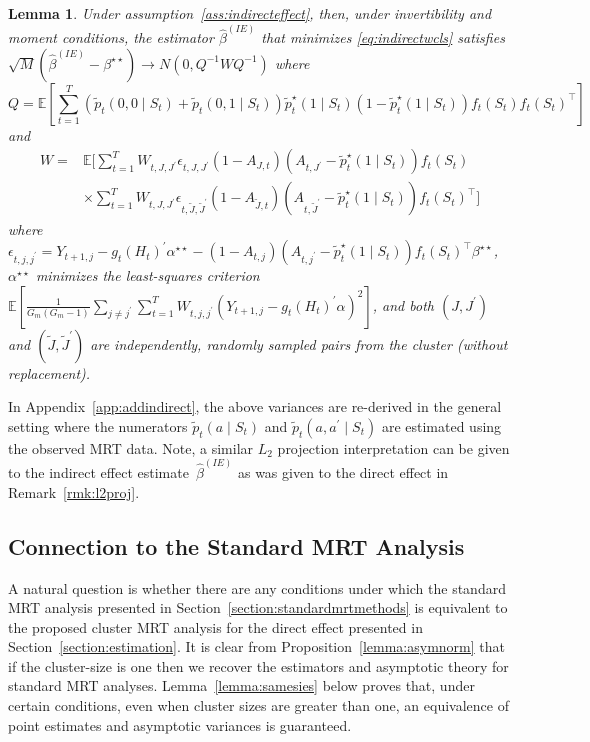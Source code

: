 \documentclass[12pt]{article}
\newtheorem{lemma}[thm]{Lemma}
\begin{document}
\begin{lemma}
\label{lemma:asymnorm2}
Under assumption~\ref{ass:indirecteffect}, then, under invertibility and moment conditions, the estimator $\hat \beta^{(IE)}$ that minimizes \eqref{eq:indirectwcls} satisfies $\sqrt{M} \left( \hat \beta^{(IE)} - \beta^{\star \star} \right) \to N(0, Q^{-1} W Q^{-1})$ where
$$
Q = \mathbb{E} \left[ \sum_{t=1}^T (\tilde p_t (0,0 \mid S_t) + \tilde p_t (0,1 \mid S_t)) \tilde p_t^\star ( 1 \mid S_{t} ) ( 1- \tilde p_t^\star ( 1 \mid S_{t} )) f_t (S_t) f_t (S_t)^\top \right]
$$
and
\begin{align*}
W =  &\mathbb{E} \bigg[ \sum_{t=1}^T W_{t,J,J^\prime} \epsilon_{t,J,J^\prime} (1-A_{J,t})( A_{t,J^\prime} - \tilde p_t^\star( 1 \mid S_{t} )) f_t (S_t) \\
&\times \sum_{t=1}^T W_{t,J,J^\prime} \epsilon_{t, \tilde J, \tilde J^\prime} (1-A_{\tilde J,t}) ( A_{t,\tilde J^\prime} - \tilde p_t^\star( 1 \mid S_{t} )) f_t (S_t)^\top  \bigg]
\end{align*}
where $\epsilon_{t,j,j^\prime} = Y_{t+1,j} - g_t(H_t)^\prime \alpha^{\star \star} - (1-A_{t,j}) (A_{t,j^\prime} - \tilde p_t^\star (1 \mid S_t) ) f_t (S_t)^\top \beta^{\star \star}$, $\alpha^{\star \star}$ minimizes the least-squares criterion $\mathbb{E}  \left[ \frac{1}{G_m (G_m-1)} \sum_{j \neq j^\prime} \sum_{t=1}^T W_{t,j,j^\prime} \left( Y_{t+1,j} - g_t(H_t)^\prime \alpha \right)^2 \right]$, and both $(J,J^\prime)$ and $(\tilde J, \tilde J^\prime)$ are independently, randomly sampled pairs from the cluster (without replacement).
\end{lemma}

In Appendix~\ref{app:addindirect}, the above variances are re-derived in the general setting where the numerators $\tilde p_t (a \mid S_t)$ and $\tilde p_t (a, a^\prime \mid S_t)$ are estimated using the observed MRT data.  Note, a similar $L_2$ projection interpretation can be given to the indirect effect estimate~$\hat \beta^{(IE)}$ as was given to the direct effect in Remark~\ref{rmk:l2proj}.


\subsection{Connection to the Standard MRT Analysis}
\label{section:samesies}
A natural question is whether there are any conditions under which the standard MRT analysis presented in Section~\ref{section:standardmrtmethods} is equivalent to the proposed cluster MRT analysis for the direct effect presented in Section~\ref{section:estimation}. It is clear from Proposition~\ref{lemma:asymnorm} that if the cluster-size is one then we recover the estimators and asymptotic theory for standard MRT analyses.  Lemma~\ref{lemma:samesies} below proves that, under certain conditions, even when cluster sizes are greater than one, an equivalence of point estimates and asymptotic variances is guaranteed.
\end{document}
